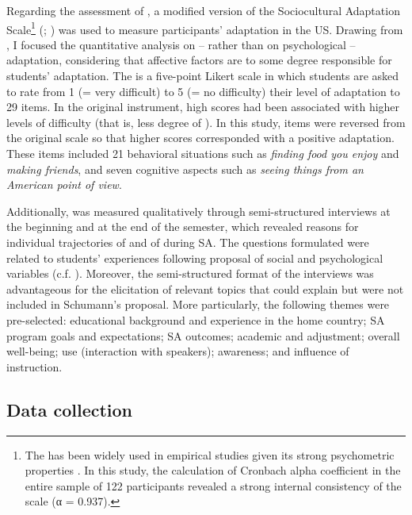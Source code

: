\documentclass[output=paper]{langsci/langscibook}
\begin{document}
\largerpage
Regarding the assessment of , a modified version of the Sociocultural Adaptation Scale\footnote{The  has been widely used in empirical studies given its strong psychometric properties \citep{CelenkVanDeVijver2011}. In this study, the calculation of Cronbach alpha coefficient in the entire sample of 122 participants revealed a strong internal consistency of the scale (α = 0.937).} (; \citealt{WardKennedy1999}) was used to measure participants’  adaptation in the US. Drawing from \citet{Berry2003}, I focused the quantitative analysis on  – rather than on psychological – adaptation, considering that affective factors are to some degree responsible for students’  adaptation. The  is a five-point Likert scale in which students are asked to rate from 1 (= very difficult) to 5 (= no difficulty) their level of adaptation to 29 items. In the original instrument, high scores had been associated with higher levels of difficulty (that is, less degree of ). In this study, items were reversed from the original scale so that higher scores corresponded with a positive adaptation. These items included 21 behavioral situations such as \textit{finding food you enjoy} and \textit{making friends}, and seven cognitive aspects such as \textit{seeing things from an American point of view}.

Additionally,  was measured qualitatively through semi-struc\-tured interviews at the beginning and at the end of the semester, which revealed reasons for individual trajectories of  and of  during SA. The questions formulated were related to students’  experiences following  proposal of social and psychological  variables (c.f. ). Moreover, the semi-structured format of the interviews was advantageous for the elicitation of relevant topics that could explain  but were not included in Schumann’s proposal. More particularly, the following themes were pre-selected: educational background and  experience in the home country; SA program goals and expectations; SA outcomes; academic and  adjustment; overall well-being;  use (interaction with  speakers);  awareness; and influence of instruction.

\subsection{Data collection}
\end{document}
